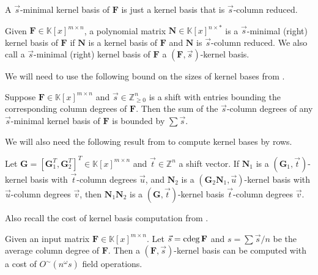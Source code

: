 A $\vec{s}$-minimal kernel basis of $\mathbf{F}$ is just a kernel
basis that is $\vec{s}$-column reduced. 
\begin{defn}
Given $\mathbf{F}\in\mathbb{K}\left[x\right]^{m\times n}$, a polynomial
matrix $\mathbf{N}\in\mathbb{K}\left[x\right]^{n\times*}$ is a $\vec{s}$-minimal
(right) kernel basis of $\mathbf{F}$ if\textbf{ $\mathbf{N}$} is
a kernel basis of $\mathbf{F}$ and $\mathbf{N}$ is $\vec{s}$-column
reduced. We also call a $\vec{s}$-minimal (right) kernel basis of
$\mathbf{F}$ a $\left(\mathbf{F},\vec{s}\right)$-kernel basis. 

We will need to use the following bound on the sizes of kernel bases
from \cite{za2012}.\end{defn}
\begin{thm}
\label{thm:boundOfSumOfShiftedDegreesOfKernelBasis}Suppose $\mathbf{F}\in\mathbb{K}\left[x\right]^{m\times n}$
and $\vec{s}\in\mathbb{Z}_{\ge0}^{n}$ is a shift with entries bounding
the corresponding column degrees of $\mathbf{F}$. Then the sum of
the $\vec{s}$-column degrees of any $\vec{s}$-minimal kernel basis
of $\mathbf{F}$ is bounded by $\sum\vec{s}$.
\end{thm}
We will also need the following result from \cite{za2012} to compute
kernel bases by rows. 
\begin{thm}
\label{thm:continueComputingKernelBasisByRows}Let $\mathbf{G}=\left[\mathbf{G}_{1}^{T},\mathbf{G}_{2}^{T}\right]^{T}\in\mathbb{K}\left[x\right]^{m\times n}$
and $\vec{t}\in\mathbb{Z}^{n}$ a shift vector. If $\mathbf{N}_{1}$
is a $\left(\mathbf{G}_{1},\vec{t}\right)$-kernel basis with $\vec{t}$-column
degrees $\vec{u}$, and $\mathbf{N}_{2}$ is a $\left(\mathbf{G}_{2}\mathbf{N}_{1},\vec{u}\right)$-kernel
basis with $\vec{u}$-column degrees $\vec{v}$, then $\mathbf{N}_{1}\mathbf{N}_{2}$
is a $\left(\mathbf{G},\vec{t}\right)$-kernel basis $\vec{t}$-column
degrees $\vec{v}$. 
\end{thm}
Also recall the cost of kernel basis computation from \cite{za2012}.
\begin{thm}
\label{thm:costGeneral} Given an input matrix $\mathbf{F}\in\mathbb{K}\left[x\right]^{m\times n}$.
Let $\vec{s}={\rm cdeg}\,\mathbf{F}$ and $s=\sum\vec{s}/n$ be the average
column degree of $\mathbf{F}$. Then a $\left(\mathbf{F},\vec{s}\right)$-kernel
basis can be computed with a cost of $O^{\sim}\left(n^{\omega}s\right)$
field operations.\end{thm}

